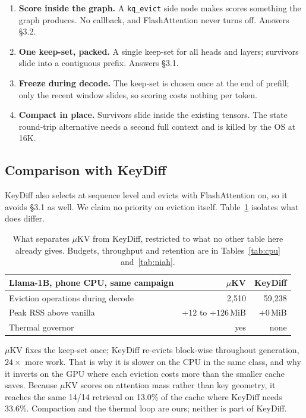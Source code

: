 \documentclass[11pt]{article}
\begin{document}
\begin{enumerate}\itemsep1pt\parskip0pt
\item \textbf{Score inside the graph.} A \texttt{kq\_evict} side node makes scores something
the graph produces. No callback, and FlashAttention never turns off. Answers \S3.2.
\item \textbf{One keep-set, packed.} A single keep-set for all heads and layers; survivors
slide into a contiguous prefix. Answers \S3.1.
\item \textbf{Freeze during decode.} The keep-set is chosen once at the end of prefill; only
the recent window slides, so scoring costs nothing per token.
\item \textbf{Compact in place.} Survivors slide inside the existing tensors. The state
round-trip alternative needs a second full context and is killed by the OS at 16K.
\end{enumerate}

\subsection{Comparison with KeyDiff}
KeyDiff also selects at sequence level and evicts with FlashAttention on, so it avoids \S3.1
as well. We claim no priority on eviction itself. Table~\ref{tab:keydiff} isolates what does differ.

\begin{table}[h]\centering\small
\caption{What separates $\mu$KV from KeyDiff, restricted to what no other table here already
gives. Budgets, throughput and retention are in Tables~\ref{tab:cpu} and~\ref{tab:niah}.}
\label{tab:keydiff}
\begin{tabular}{@{}lrr@{}}
\toprule
\textbf{Llama-1B, phone CPU, same campaign} & \textbf{$\mu$KV} & \textbf{KeyDiff}\\
\midrule
\rowcolor{cA!8} Eviction operations during decode & 2{,}510 & 59{,}238\\
Peak RSS above vanilla & $+12$ to $+126$\,MiB & $+0$\,MiB\\
Thermal governor & yes & none\\
\bottomrule
\end{tabular}
\end{table}

\noindent $\mu$KV fixes the keep-set once; KeyDiff re-evicts block-wise throughout
generation, $24\times$ more work. That is why it is slower on the CPU in the same class, and
why it inverts on the GPU where each eviction costs more than the smaller cache saves.
Because $\mu$KV scores on attention mass rather than key geometry, it reaches the same 14/14
retrieval on 13.0\% of the cache where KeyDiff needs 33.6\%. Compaction and the thermal loop
are ours; neither is part of KeyDiff.
\end{document}
